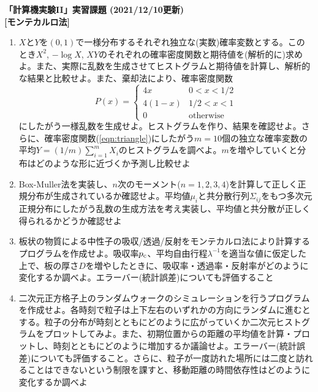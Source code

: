 \documentclass[11pt]{jarticle}
\begin{document}
\noindent
{\bf\large 「計算機実験II」実習課題 (2021/12/10更新)}
\\[-0.5em]

{\bf [モンテカルロ法]}
\begin{enumerate}

\item $X$と$Y$を$(0,1)$で一様分布するそれぞれ独立な(実数)確率変数とする。このとき$X^2$, $-\log X$, $XY$のそれぞれの確率密度関数と期待値を(解析的に)求めよ。また、実際に乱数を生成させてヒストグラムと期待値を計算し、解析的な結果と比較せよ。また、棄却法により、確率密度関数
  \begin{equation}
    P(x) = \begin{cases} 4x & 0 < x < 1/2 \\
      4(1-x) & 1/2 < x < 1 \\
      0 & \text{otherwise}
    \end{cases}
    \label{eqn:triangle}
  \end{equation}
  にしたがう一様乱数を生成せよ。ヒストグラムを作り、結果を確認せよ。さらに、確率密度関数(\ref{eqn:triangle})にしたがう$m=10$個の独立な確率変数の平均$Y=(1/m) \sum_{i=1}^m X_i$のヒストグラムを調べよ。$m$を増やしていくと分布はどのような形に近づくか予測し比較せよ
  
\item Box-Muller法を実装し、$n$次のモーメント($n=1,2,3,4$)を計算して正しく正規分布が生成されているか確認せよ。平均値$\mu_i$と共分散行列$\Sigma_{ij}$をもつ多次元正規分布にしたがう乱数の生成方法を考え実装し、平均値と共分散が正しく得られるかどうか確認せよ

\item 板状の物質による中性子の吸収/透過/反射をモンテカルロ法により計算するプログラムを作成せよ。吸収率$p_{\rm c}$、平均自由行程$\lambda^{-1}$を適当な値に仮定した上で、板の厚さ$D$を増やしたときに、吸収率・透過率・反射率がどのように変化するか調べよ。エラーバー(統計誤差)についても評価すること

\item 二次元正方格子上のランダムウォークのシミュレーションを行うプログラムを作成せよ。各時刻で粒子は上下左右のいずれかの方向にランダムに進むとする。粒子の分布が時刻とともにどのように広がっていくか二次元ヒストグラムをプロットしてみよ。また、初期位置からの距離の平均値を計算・プロットし、時刻とともにどのように増加するか議論せよ。エラーバー(統計誤差)についても評価すること。さらに、粒子が一度訪れた場所には二度と訪れることはできないという制限を課すと、移動距離の時間依存性はどのように変化するか調べよ
  

\end{enumerate}
\end{document}
